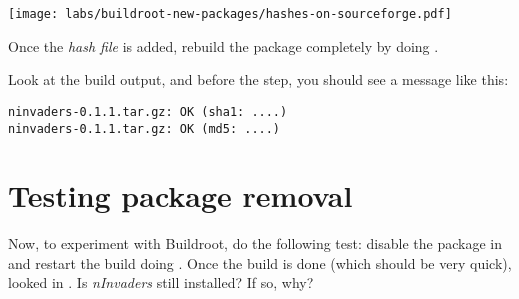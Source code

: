 \begin{center}
\texttt{[image: labs/buildroot-new-packages/hashes-on-sourceforge.pdf]}
\end{center}

Once the {\em hash file} is added, rebuild the package completely by
doing .

Look at the build output, and before the  step, you should see a message like this:

\begin{verbatim}
ninvaders-0.1.1.tar.gz: OK (sha1: ....)
ninvaders-0.1.1.tar.gz: OK (md5: ....)
\end{verbatim}

\section{Testing package removal}

Now, to experiment with Buildroot, do the following test: disable the
 package in  and restart the build
doing . Once the build is done (which should be very
quick), looked in . Is {\em nInvaders} still
installed? If so, why?
